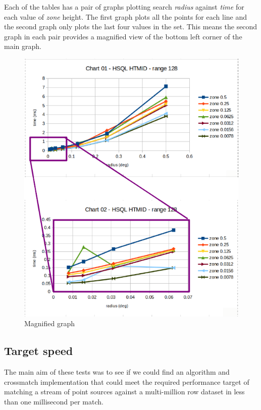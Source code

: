 \documentclass{article}
\newcommand{\crossmatch} {crossmatch\xspace}
\newcommand{\dataset} {dataset\xspace}
\begin{document}
Each of the tables has a pair of graphs plotting search \textit{ radius} against \textit{time} for each value of \textit{zone} height. The first graph plots all the points for each line and the second graph only plots the last four values in the set. This means the second graph in each pair provides a magnified view of the bottom left corner of the main graph.

\begin{figure}[hbt!]
\centering
\includegraphics[scale=0.75]{images/graph-zoom-01.png}
\caption{Magnified graph}
\label{fig:graph-zoom-01}
\end{figure}

\subsection{Target speed}
\label{target-speed}

The main aim of these tests was to see if we could find an algorithm and \crossmatch implementation that could meet the required performance target of matching a stream of point sources against a multi-million row \dataset in less than one millisecond per match.
\end{document}
